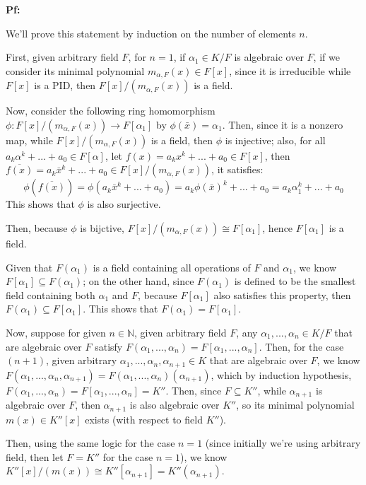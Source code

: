 \documentclass{article}
\begin{document}
\textbf{Pf:}

We'll prove this statement by induction on the number of elements $n$.

\hfil

First, given arbitrary field $F$, for $n=1$, if $\alpha_1\in K/F$ is algebraic over $F$, if we consider its minimal polynomial $m_{\alpha,F}(x)\in F[x]$, since it is irreducible while $F[x]$ is a PID,
then $F[x]/(m_{\alpha,F}(x))$ is a field. 

Now, consider the following ring homomorphism $\phi:F[x]/(m_{\alpha,F}(x))\rightarrow F[\alpha_1]$ by $\phi(\bar{x})=\alpha_1$. Then, since it is a nonzero map, while $F[x]/(m_{\alpha,F}(x))$ is a field, then $\phi$ is injective;
also, for all $a_k\alpha^k+...+a_0\in F[\alpha]$, let $f(x)=a_kx^k+...+a_0\in F[x]$, then $\overline{f(x)}=a_k\bar{x}^k+...+a_0\in F[x]/(m_{\alpha,F}(x))$, it satisfies: 
$$\phi(\overline{f(x)})=\phi(a_k\bar{x}^k+...+a_0)=a_k\phi(\bar{x})^k+...+a_0=a_k\alpha_1^k+...+a_0$$
This shows that $\phi$ is also surjective.

Then, because $\phi$ is bijctive, $F[x]/(m_{\alpha,F}(x))\cong F[\alpha_1]$, hence $F[\alpha_1]$ is a field.

Given that $F(\alpha_1)$ is a field containing all operations of $F$ and $\alpha_1$, we know $F[\alpha_1]\subseteq F(\alpha_1)$; on the other hand, since $F(\alpha_1)$ is defined to be the smallest field containing both $\alpha_1$ and $F$,
because $F[\alpha_1]$ also satisfies this property, then $F(\alpha_1)\subseteq F[\alpha_1]$. This shows that $F(\alpha_1)=F[\alpha_1]$.

\hfil

Now, suppose for given $n\in\mathbb{N}$, given arbitrary field $F$, any $\alpha_1,...,\alpha_n\in K/F$ that are algebraic over $F$ satisfy $F(\alpha_1,...,\alpha_n)=F[\alpha_1,...,\alpha_n]$.
Then, for the case $(n+1)$, given arbitrary $\alpha_1,...,\alpha_n,\alpha_{n+1}\in K$ that are algebraic over $F$, we know $F(\alpha_1,...,\alpha_n,\alpha_{n+1})=F(\alpha_1,...,\alpha_n)(\alpha_{n+1})$,
which by induction hypothesis, $F(\alpha_1,...,\alpha_n)=F[\alpha_1,...,\alpha_n]=K''$. Then, since $F\subseteq K''$, while $\alpha_{n+1}$ is algebraic over $F$, then $\alpha_{n+1}$ is also algebraic over $K''$, so its minimal polynomial $m(x)\in K''[x]$ exists (with respect to field $K''$).

Then, using the same logic for the case $n=1$ (since initially we're using arbitrary field, then let $F=K''$ for the case $n=1$), we know $K''[x]/(m(x))\cong K''[\alpha_{n+1}]=K''(\alpha_{n+1})$.
\end{document}
